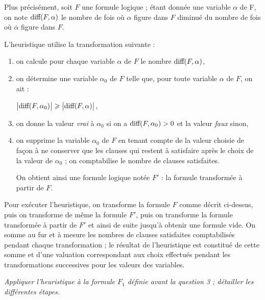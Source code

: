 Plus précisément, soit $F$ une formule logique ; étant donnée une variable $\alpha$ de F, on note $\text{\rm diff}(F, \alpha )$ le nombre de fois où $\alpha$ figure dans $F$ diminué du nombre de fois où $\overline \alpha$ figure dans $F$.

\medskip

L’heuristique utilise la transformation suivante :
\begin{enumerate}
  \item on calcule pour chaque variable $\alpha$ de $F$ le nombre $\text{\rm diff}(F, \alpha )$,
  \item on détermine une variable $\alpha_0$ de $F$ telle que, pour toute variable $\alpha$ de $F$, on ait :
  
$\bigl|\text{\rm diff}(F, \alpha_0 )\bigr| \geqslant \bigl|\text{\rm diff}(F, \alpha)\bigr|$,
  \item on donne la valeur {\it vrai} à $\alpha_0$ si on a $\text{\rm diff}(F, \alpha_0 ) > 0$ et la valeur {\it faux} sinon,
\item on supprime la variable $\alpha_0$ de $F$ en tenant compte de la valeur choisie de façon à ne conserver que les clauses qui restent à satisfaire après le choix de la valeur de $\alpha_0$ ; on comptabilise le nombre de clauses satisfaites. 
  
  On obtient ainsi une formule logique notée $F'$ : la formule transformée à partir de $F$.
\end{enumerate}
Pour exécuter l’heuristique, on transforme la formule $F$ comme décrit ci-dessus, puis on transforme de même la formule $F'$, puis on transforme la formule transformée à partir de $F'$ et ainsi de suite jusqu’à obtenir une formule vide. On somme au fur et à mesure les nombres de clauses satisfaites comptabilisés pendant chaque transformation ; le résultat de l’heuristique est constitué de cette somme et d’une valuation correspondant aux choix effectués pendant les transformations successives pour les valeurs des variables.
\begin{Exercise}\it
Appliquer l’heuristique à la formule $F_1$ définie avant la question 3 ;
détailler les différentes étapes.
\end{Exercise}
